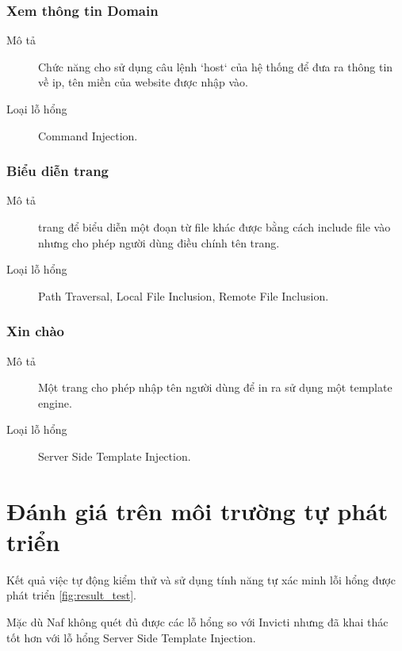\documentclass[./../main.tex]{subfiles}
\begin{document}
\subsubsection{Xem thông tin Domain}

\begin{description}
	\item[Mô tả] Chức năng cho sử dụng câu lệnh `host` của hệ thống để đưa ra thông tin về ip, tên miền của website được nhập vào.
	\item[Loại lỗ hổng] Command Injection.
\end{description}

\subsubsection{Biểu diễn trang}

\begin{description}
	\item[Mô tả] trang để biểu diễn một đoạn từ file khác được bằng cách
	      include file vào nhưng cho phép người dùng điều chính tên trang.
	\item[Loại lỗ hổng] Path Traversal, Local File Inclusion, Remote
	      File Inclusion.
\end{description}

\subsubsection{Xin chào}

\begin{description}
	\item[Mô tả] Một trang cho phép nhập tên người dùng để in ra sử dụng một template engine.
	\item[Loại lỗ hổng] Server Side Template Injection.
\end{description}


\section{Đánh giá trên môi trường tự phát triển}

Kết quả việc tự động kiểm thử và sử dụng tính năng tự xác minh lỗi
hổng được phát triển \ref{fig:result_test}.

Mặc dù Naf không quét đủ được các lỗ hổng so với Invicti nhưng đã khai thác tốt hơn với lỗ hổng Server Side Template Injection.
\end{document}
